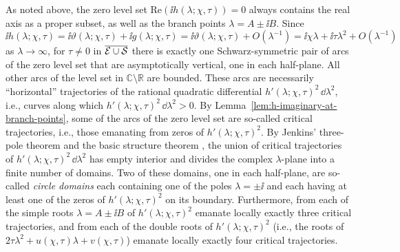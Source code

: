 As noted above, the zero level set $\mathrm{Re}(\ii h(\lambda;\chi,\tau))=0$ always contains the real axis as a proper subset, as well as the branch points $\lambda=A\pm\ii B$.  Since $\ii h(\lambda;\chi,\tau)=\ii \vartheta(\lambda;\chi,\tau)+\ii g(\lambda;\chi,\tau)=\ii \vartheta(\lambda;\chi,\tau)+O(\lambda^{-1})=\ii \chi\lambda+\ii \tau\lambda^2+O(\lambda^{-1})$ as $\lambda\to\infty$, for $\tau\neq 0$ in $\overline{\mathcal{E}\cup\mathcal{S}}$ there is exactly one Schwarz-symmetric pair of arcs of the zero level set that are asymptotically vertical, one in each half-plane.  All other arcs of the level set in $\mathbb{C}\setminus\mathbb{R}$ are bounded.  These arcs are necessarily ``horizontal'' trajectories of the rational quadratic differential $h'(\lambda;\chi,\tau)^2\,\dd\lambda^2$, i.e., curves along which $h'(\lambda;\chi,\tau)^2\,\dd\lambda^2>0$.  By Lemma~\ref{lem:h-imaginary-at-branch-points}, some of the arcs of the zero level set are so-called critical trajectories, i.e., those emanating from zeros of $h'(\lambda;\chi,\tau)^2$.  By Jenkins' three-pole theorem \cite[Theorem 3.6]{Jenkins58} and the basic structure theorem \cite[Theorem 3.5]{Jenkins58}, the union of critical trajectories of $h'(\lambda;\chi,\tau)^2\,\dd\lambda^2$ has empty interior and divides the complex $\lambda$-plane into a finite number of domains.  Two of these domains, one in each half-plane, are so-called \emph{circle domains} each containing one of the poles $\lambda=\pm\ii$ and each having at least one of the zeros of $h'(\lambda;\chi,\tau)^2$ on its boundary.  Furthermore, from each of the simple roots $\lambda=A\pm\ii B$ of $h'(\lambda;\chi,\tau)^2$ emanate locally exactly three critical trajectories, and from each of the double roots of $h'(\lambda;\chi,\tau)^2$ (i.e., the roots of $2\tau\lambda^2+u(\chi,\tau)\lambda+v(\chi,\tau)$) emanate locally exactly four critical trajectories.

